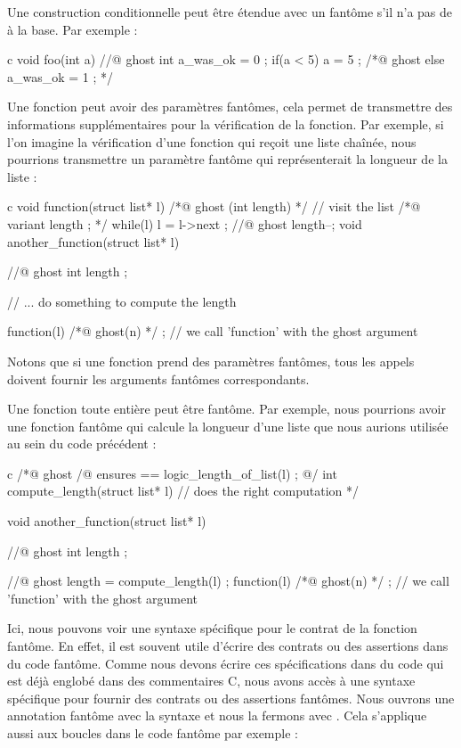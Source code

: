 Une construction conditionnelle  peut être étendue avec un
 fantôme s'il n'a pas de  à la base. Par
exemple :


\begin{CodeBlock}{c}
void foo(int a){
  //@ ghost int a_was_ok = 0 ;
  if(a < 5){
    a = 5 ;
  } /*@ ghost else {
    a_was_ok = 1 ;
  } */
}
\end{CodeBlock}


Une fonction peut avoir des paramètres fantômes, cela permet de transmettre des
informations supplémentaires pour la vérification de la fonction. Par exemple,
si l'on imagine la vérification d'une fonction qui reçoit une liste chaînée,
nous pourrions transmettre un paramètre fantôme qui représenterait la
longueur de la liste :


\begin{CodeBlock}{c}
void function(struct list* l) /*@ ghost (int length) */ {
  // visit the list
  /*@ variant length ; */
  while(l){
    l = l->next ;
    //@ ghost length--;
  }
}
void another_function(struct list* l){
  //@ ghost int length ;

  // ... do something to compute the length

  function(l) /*@ ghost(n) */ ; // we call 'function' with the ghost argument
}
\end{CodeBlock}


Notons que si une fonction prend des paramètres fantômes, tous les appels doivent
fournir les arguments fantômes correspondants.


Une fonction toute entière peut être fantôme. Par exemple, nous pourrions avoir
une fonction fantôme qui calcule la longueur d'une liste que nous aurions utilisée
au sein du code précédent :

\begin{CodeBlock}{c}
/*@ ghost
  /@ ensures \result == logic_length_of_list(l) ; @/
  int compute_length(struct list* l){
    // does the right computation
  }
*/

void another_function(struct list* l){
  //@ ghost int length ;

  //@ ghost length = compute_length(l) ;
  function(l) /*@ ghost(n) */ ; // we call 'function' with the ghost argument
}
\end{CodeBlock}


Ici, nous pouvons voir une syntaxe spécifique pour le contrat de la fonction
fantôme. En effet, il est souvent utile d'écrire des contrats ou des assertions
dans du code fantôme. Comme nous devons écrire ces spécifications dans du code
qui est déjà englobé dans des commentaires C, nous avons accès à une syntaxe
spécifique pour fournir des contrats ou des assertions fantômes. Nous ouvrons
une annotation fantôme avec la syntaxe  et nous la fermons avec
. Cela s'applique aussi aux boucles dans le code fantôme par
exemple :


